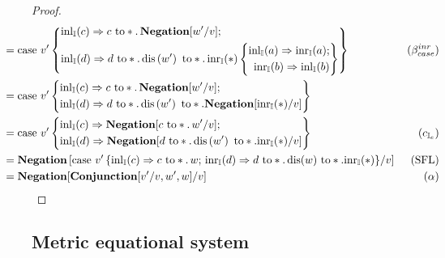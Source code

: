 \begin{proof}
\begin{align*}
      & \hspace{-27pt} = \text{case }  v'
    \left\{ \begin{aligned}
      &\inl_{\typeI}(c) \Rightarrow c \text{ to} *. \,   \textbf{Negation}[w'/v];  \\
      & \inl_{\typeI}(d) \Rightarrow   d \text{ to} *. \, \text{dis}\left( w'\right) \text{ to} *. \,  \inr_{\typeI}(*) \left\{ \begin{aligned}  
          \inl_{\typeI}(a) \Rightarrow \inr_{\typeI}(a) ; \\
          \inr_{\typeI}(b) \Rightarrow \inl_{\typeI}(b)
          \end{aligned} \right\}
    \end{aligned} \right\}  
   \, & (\beta_{case}^{inr}) \\
   & \hspace{-27pt} = \text{case }  v'
    \left\{ \begin{aligned}
      &\inl_{\typeI}(c) \Rightarrow  c \text{ to} *. \, \textbf{Negation}[ w'/v];  \\
      & \inl_{\typeI}(d) \Rightarrow   d \text{ to} *. \, \text{dis}\left( w'\right) \text{ to} *. \textbf{Negation}[\inr_{\typeI}(*)/v]
    \end{aligned} \right\}  
   \, &  \\
   & \hspace{-27pt} = \text{case }  v'
    \left\{ \begin{aligned}
      &\inl_{\typeI}(c) \Rightarrow  \textbf{Negation}[c \text{ to} *. \, w'/v];  \\
      & \inl_{\typeI}(d) \Rightarrow  \textbf{Negation}[ d \text{ to} *. \, \text{dis}\left( w'\right) \text{ to} *.\inr_{\typeI}(*)/v]
    \end{aligned} \right\}  
   \, & (c_{\mathbb{I}_{e}}) \\
   & \hspace{-27pt} = \textbf{Negation}\left[ \text{case } v'\,
\{\inl_{\typeI}(c) \Rightarrow c \text{ to} *. \, w ; 
\, \inr_{\typeI}(d) \Rightarrow d \text{ to} *. \,  \text{dis}(w) \text{ to} *. \inr_{\typeI}(*)
\} / v\right] 
   \, & (\text{SFL})  \\
   & \hspace{-27pt} = \textbf{Negation}[\textbf{Conjunction} [v'/v, w',w]  /v] & (\alpha)
  \end{align*}
\end{proof}


\subsection{Metric equational system}

